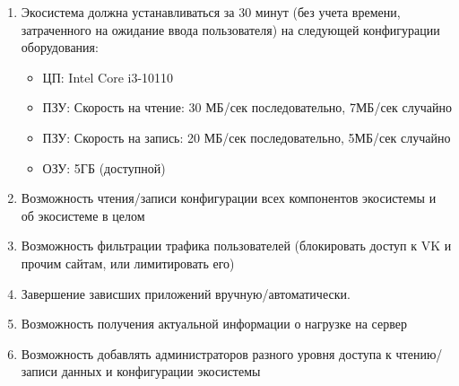 \begin{enumerate}[label={\bfseries ПТ-\arabic*}]
\begin{enumerate}[label*={\bfseries.\arabic*}]
            \item Экосистема должна устанавливаться за 30 минут (без учета времени, затраченного на
                  ожидание ввода пользователя) на следующей конфигурации оборудования:
                  \begin{itemize}
                     \item ЦП: Intel Core i3-10110
                     \item ПЗУ: Скорость на чтение: 30 МБ/сек последовательно, 7МБ/сек случайно
                     \item ПЗУ: Скорость на запись: 20 МБ/сек последовательно, 5МБ/сек случайно
                     \item ОЗУ: 5ГБ (доступной)
                  \end{itemize}
            \item Возможность чтения/записи конфигурации всех компонентов экосистемы и об экосистеме в целом
            \item Возможность фильтрации трафика пользователей (блокировать доступ к VK и прочим сайтам, или лимитировать его)
            \item Завершение зависших приложений вручную/автоматически.
            \item Возможность получения актуальной информации о нагрузке на сервер
            \item Возможность добавлять администраторов разного уровня доступа к чтению/записи данных и конфигурации экосистемы
         \end{enumerate}
\end{enumerate}

